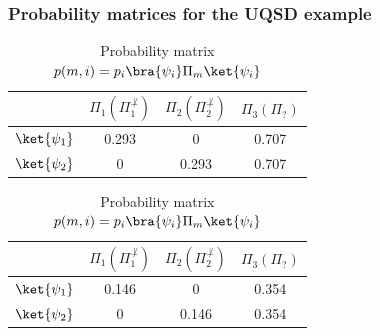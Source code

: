 \documentclass{beamer}
\begin{document}
\begin{frame}
    \frametitle{Probability matrices for the UQSD example}
    \begin{table}[ht]
        \begin{tabular}{c | c c c}
                             & $\Pi_{1} (\Pi_{1}^{\not\perp})$ & $\Pi_{2} (\Pi_{2}^{\not\perp})$ & $\Pi_{3} (\Pi_{?})$ \\
            \hline
            $\ket{\psi_{1}}$ & 0.293                           & 0                               & 0.707               \\
            $\ket{\psi_{2}}$ & 0                               & 0.293                           & 0.707               \\
        \end{tabular}
        \caption{Probability matrix $p(m|i) = \bra{\psi_{i}} \Pi_{m} \ket{\psi_{i}}$}
        \begin{tabular}{c | c c c}
                             & $\Pi_{1} (\Pi_{1}^{\not\perp})$ & $\Pi_{2} (\Pi_{2}^{\not\perp})$ & $\Pi_{3} (\Pi_{?})$ \\
            \hline
            $\ket{\psi_{1}}$ & 0.146                           & 0                               & 0.354               \\
            $\ket{\psi_{2}}$ & 0                               & 0.146                           & 0.354               \\
        \end{tabular}
        \caption{Probability matrix $p(m,i) = p_{i} \bra{\psi_{i}} \Pi_{m} \ket{\psi_{i}}$}
        \label{tab:uqsd_ex}
    \end{table}
\end{frame}
\end{document}
